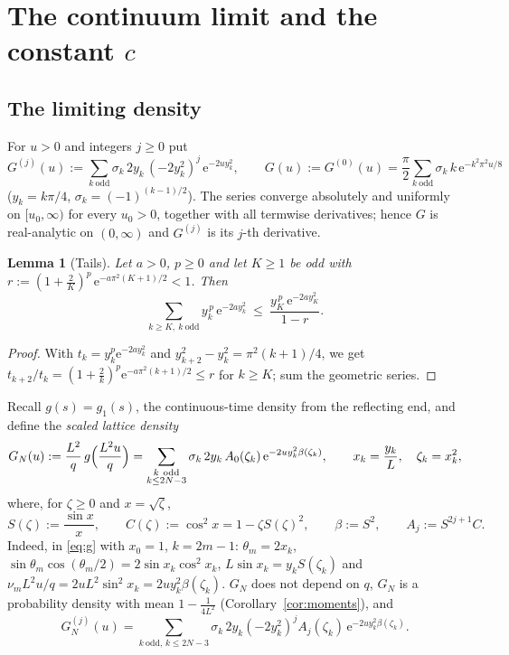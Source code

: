 \documentclass[11pt,a4paper]{article}
\newtheorem{lemma}[theorem]{Lemma}
\theoremstyle{definition}
\theoremstyle{remark}
\newcommand{\ee}{\mathrm{e}}
\begin{document}
\section{The continuum limit and the constant \texorpdfstring{$c$}{c}}\label{sec:continuum}

\subsection{The limiting density}

For $u>0$ and integers $j\ge0$ put
\begin{equation}\label{eq:G}
  G^{(j)}(u):=\sum_{k\ \mathrm{odd}}\sigma_k\,2y_k\,(-2y_k^2)^j\,\ee^{-2uy_k^2},\qquad
  G(u):=G^{(0)}(u)=\frac\pi2\sum_{k\ \mathrm{odd}}\sigma_k\,k\,\ee^{-k^2\pi^2u/8}
\end{equation}
($y_k=k\pi/4$, $\sigma_k=(-1)^{(k-1)/2}$). The series converge absolutely and uniformly on $[u_0,\infty)$ for
every $u_0>0$, together with all termwise derivatives; hence $G$ is real-analytic on $(0,\infty)$ and
$G^{(j)}$ is its $j$-th derivative.

\begin{lemma}[Tails]\label{lem:tail}
Let $a>0$, $p\ge0$ and let $K\ge1$ be odd with $r:=(1+\frac2K)^p\,\ee^{-a\pi^2(K+1)/2}<1$. Then
\[
  \sum_{k\ge K,\ k\ \mathrm{odd}}y_k^{\,p}\,\ee^{-2ay_k^2}\ \le\ \frac{y_K^{\,p}\,\ee^{-2ay_K^2}}{1-r}.
\]
\end{lemma}
\begin{proof}
With $t_k=y_k^p\ee^{-2ay_k^2}$ and $y_{k+2}^2-y_k^2=\pi^2(k+1)/4$, we get
$t_{k+2}/t_k=(1+\frac2k)^p\ee^{-a\pi^2(k+1)/2}\le r$ for $k\ge K$; sum the geometric series.
\end{proof}

Recall $g(s)=g_1(s)$, the continuous-time density from the reflecting end, and define the \emph{scaled lattice
density}
\begin{equation}\label{eq:GN}
  G_N(u):=\frac{L^2}{q}\,g\Bigl(\frac{L^2u}{q}\Bigr)
  =\sum_{\substack{k\ \mathrm{odd}\\ k\le 2N-3}}\sigma_k\,2y_k\,A_0(\zeta_k)\,\ee^{-2uy_k^2\beta(\zeta_k)},
  \qquad x_k=\frac{y_k}{L},\quad \zeta_k=x_k^2 ,
\end{equation}
where, for $\zeta\ge0$ and $x=\sqrt\zeta$,
\begin{equation}\label{eq:SCbeta}
  S(\zeta):=\frac{\sin x}{x},\qquad C(\zeta):=\cos^2x=1-\zeta S(\zeta)^2,\qquad \beta:=S^2,\qquad
  A_j:=S^{2j+1}C .
\end{equation}
Indeed, in \eqref{eq:g} with $x_0=1$, $k=2m-1$: $\theta_m=2x_k$, $\sin\theta_m\cos(\theta_m/2)=2\sin x_k\cos^2x_k$,
$L\sin x_k=y_kS(\zeta_k)$ and $\nu_mL^2u/q=2uL^2\sin^2x_k=2uy_k^2\beta(\zeta_k)$. $G_N$ does not depend on $q$,
$G_N$ is a probability density with mean $1-\frac1{4L^2}$ (Corollary~\ref{cor:moments}), and
\begin{equation}\label{eq:GNj}
  G_N^{(j)}(u)=\sum_{k\ \mathrm{odd},\,k\le2N-3}\sigma_k\,2y_k(-2y_k^2)^jA_j(\zeta_k)\,\ee^{-2uy_k^2\beta(\zeta_k)} .
\end{equation}
\end{document}
